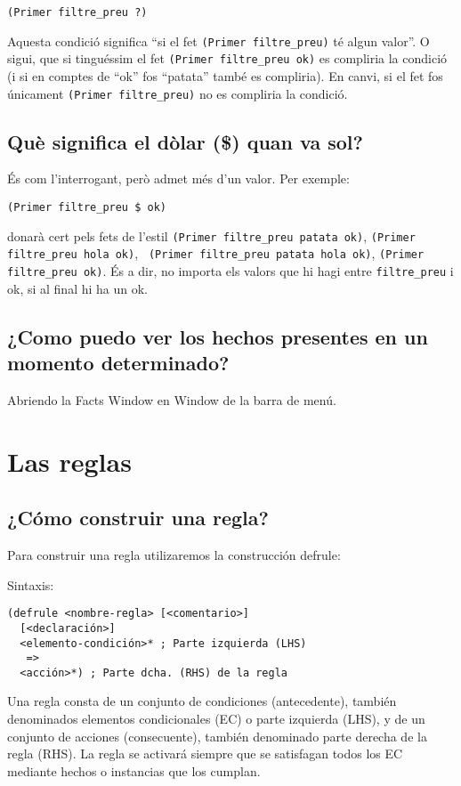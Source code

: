 \documentclass[11pt,svgnames]{scrbook}
\begin{document}
\texttt{(Primer filtre\_preu ?)}
\medskip

Aquesta condició significa ``si el fet \texttt{(Primer filtre\_preu)} té algun
valor''. O sigui, que si tinguéssim el fet \texttt{(Primer filtre\_preu ok)} es
compliria la condició (i si en comptes de ``ok'' fos ``patata'' també es
compliria). En canvi, si el fet fos únicament \texttt{(Primer filtre\_preu)} no
es compliria la condició.

\subsection{Què significa el dòlar (\$) quan va sol?}

És com l'interrogant, però admet més d'un valor. Per exemple:
\medskip

{\tt (Primer filtre\_preu \$ ok)}
\medskip

donarà cert pels fets de l'estil \texttt{(Primer filtre\_preu patata ok)},
\texttt{(Primer filtre\_preu hola ok)}, \texttt{ (Primer filtre\_preu patata
hola ok)},
\texttt{(Primer filtre\_preu ok)}.
És a dir, no importa els valors que hi hagi entre \texttt{filtre\_preu} i ok, si
al final hi ha un ok.

\subsection{¿Como puedo ver los hechos presentes en un momento determinado?}

Abriendo la Facts Window en Window de la barra de menú.


\section{Las reglas}

\subsection{¿Cómo construir una regla?}

Para construir una regla utilizaremos la construcción defrule:

Sintaxis:

\begin{verbatim}
(defrule <nombre-regla> [<comentario>]
  [<declaración>]
  <elemento-condición>* ; Parte izquierda (LHS)
   =>
  <acción>*) ; Parte dcha. (RHS) de la regla
\end{verbatim}

Una regla consta de un conjunto de condiciones (antecedente), también
denominados elementos condicionales (EC) o parte izquierda (LHS), y de un
conjunto de acciones (consecuente), también denominado parte derecha de la regla
(RHS). La regla se activará siempre que se satisfagan todos los EC mediante
hechos o instancias que los cumplan.
\end{document}
